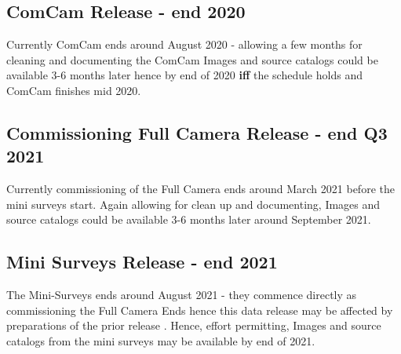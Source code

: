\subsection{ComCam Release - end 2020}
Currently ComCam ends  around August 2020 - allowing a few months for cleaning and documenting the
ComCam Images and source catalogs  could be available 3-6 months later hence by end of 2020 {\bf iff} the schedule holds and ComCam finishes mid 2020.

\subsection{Commissioning Full Camera  Release - end Q3 2021} \label{sect:cfc}
Currently commissioning of the Full Camera ends  around March 2021 before the mini surveys start.
Again allowing for clean up and documenting,  Images and source catalogs  could be available 3-6 months later around September 2021.

\subsection{Mini Surveys  Release - end 2021}
The Mini-Surveys ends  around August 2021 - they commence directly as commissioning the Full Camera Ends  hence this data release may be affected by preparations of the prior release .
Hence, effort permitting,  Images and source catalogs from the mini surveys may be available by end of 2021.
